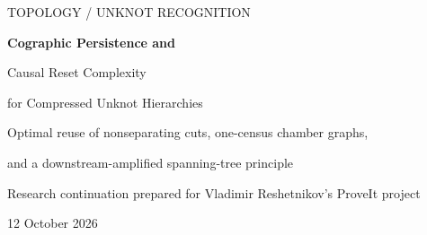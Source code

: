 \documentclass[11pt]{article}
\theoremstyle{definition}
\begin{document}
\begin{titlepage}
\vspace*{0.3in}
{\large\sffamily\color{ink} TOPOLOGY / UNKNOT RECOGNITION\par}
\vspace{0.28in}
{\LARGE\bfseries Cographic Persistence and\par
Causal Reset Complexity\par}
\vspace{0.13in}
{\Large for Compressed Unknot Hierarchies\par}
\vspace{0.25in}
{\large Optimal reuse of nonseparating cuts, one-census chamber graphs,\par
and a downstream-amplified spanning-tree principle\par}
\vspace{0.3in}
{Research continuation prepared for Vladimir Reshetnikov's ProveIt project\par}
{12 October 2026\par}
\vspace{0.24in}
\begin{abstract}
A compressed local operation does not by itself control the repeated destruction and reconstruction of later hierarchy work. We develop a certificate-based approach to this reset bottleneck. For a source-authenticated system of connected, disjoint, cooriented surfaces, we recover its chamber graph from one scalar weighted-orbit census. The nonseparating subbatches are exactly the independent sets of the cographic matroid. A minimum-weight spanning tree therefore selects an optimal batch, while a shared routing forest supplies dual-loop descriptions in an explicit finite source arena.

The geometric certificate is a surface together with a loop crossing it once and avoiding the other retained surfaces. We prove precisely which local modifications preserve these witnesses. We then analyze a fixed acyclic graph of genuine certificate dependencies. If a task has rebuild cap $g_i$ and initial remaining potential $d_i$, its number of version changes is bounded by
\[
 B_i=d_i+(g_i+1)\sum_{j\to i}B_j.
\]
The bound expands as a weighted sum over directed paths and is sharp on chains. An eventwise potential also accounts for unobserved parent changes and explicitly charges changes of dependency arena. A reverse recurrence computes the downstream cost of lost progress. Combining these costs with the chamber graph gives an exact minimum-spanning-tree rule for minimizing the resulting certified restart bound.


\end{abstract}
\end{titlepage}
\end{document}
